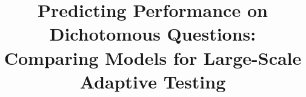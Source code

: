 \documentclass{sig-alternate}
\begin{document}
%

\title{Predicting Performance on Dichotomous Questions:\\Comparing Models for Large-Scale Adaptive Testing}
%
%
%
%
%
\end{document}
